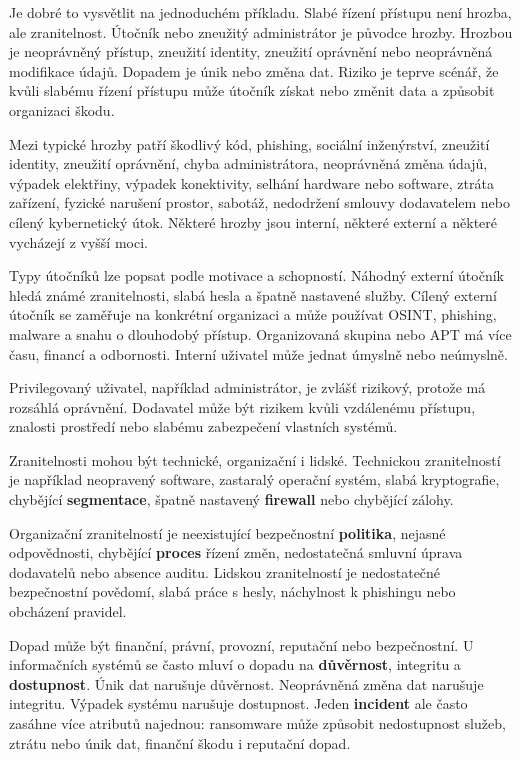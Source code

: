 Je dobré to vysvětlit na jednoduchém příkladu. Slabé řízení přístupu není hrozba, ale zranitelnost. Útočník nebo zneužitý administrátor je původce hrozby. Hrozbou je neoprávněný přístup, zneužití identity, zneužití oprávnění nebo neoprávněná modifikace údajů. Dopadem je únik nebo změna dat. Riziko je teprve scénář, že kvůli slabému řízení přístupu může útočník získat nebo změnit data a způsobit organizaci škodu.

Mezi typické hrozby patří škodlivý kód, phishing, sociální inženýrství, zneužití identity, zneužití oprávnění, chyba administrátora, neoprávněná změna údajů, výpadek elektřiny, výpadek konektivity, selhání hardware nebo software, ztráta zařízení, fyzické narušení prostor, sabotáž, nedodržení smlouvy dodavatelem nebo cílený kybernetický útok. Některé hrozby jsou interní, některé externí a některé vycházejí z vyšší moci.

Typy útočníků lze popsat podle motivace a schopností. Náhodný externí útočník hledá známé zranitelnosti, slabá hesla a špatně nastavené služby. Cílený externí útočník se zaměřuje na konkrétní organizaci a může používat OSINT, phishing, malware a snahu o dlouhodobý přístup. Organizovaná skupina nebo APT má více času, financí a odbornosti. Interní uživatel může jednat úmyslně nebo neúmyslně.

Privilegovaný uživatel, například administrátor, je zvlášť rizikový, protože má rozsáhlá oprávnění. Dodavatel může být rizikem kvůli vzdálenému přístupu, znalosti prostředí nebo slabému zabezpečení vlastních systémů.

Zranitelnosti mohou být technické, organizační i lidské. Technickou zranitelností je například neopravený software, zastaralý operační systém, slabá kryptografie, chybějící \textbf{segmentace}, špatně nastavený \textbf{firewall} nebo chybějící zálohy.

Organizační zranitelností je neexistující bezpečnostní \textbf{politika}, nejasné odpovědnosti, chybějící \textbf{proces} řízení změn, nedostatečná smluvní úprava dodavatelů nebo absence auditu. Lidskou zranitelností je nedostatečné bezpečnostní povědomí, slabá práce s hesly, náchylnost k phishingu nebo obcházení pravidel.

Dopad může být finanční, právní, provozní, reputační nebo bezpečnostní. U informačních systémů se často mluví o dopadu na \textbf{důvěrnost}, integritu a \textbf{dostupnost}. Únik dat narušuje důvěrnost. Neoprávněná změna dat narušuje integritu. Výpadek systému narušuje dostupnost. Jeden \textbf{incident} ale často zasáhne více atributů najednou: ransomware může způsobit nedostupnost služeb, ztrátu nebo únik dat, finanční škodu i reputační dopad.

